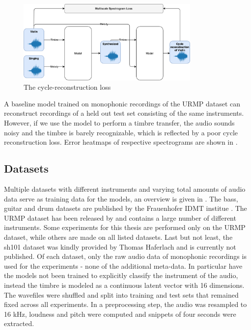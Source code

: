 \begin{figure}
\centering
\includegraphics[width=0.8\textwidth]{figures/cycle_reconstruction_loss.png}
\caption{The cycle-reconstruction loss}
\label{cycle-reconstruction}
\end{figure}

A baseline model trained on monophonic recordings of the URMP dataset can reconstruct recordings of a held out test set consisting of the same instruments.
However, if we use the model to perform a timbre transfer, the audio sounds noisy and the timbre is barely recognizable, which is reflected by a poor cycle reconstruction loss. Error heatmaps of respective spectrograms are shown in .


\subsection{Datasets}
\label{datasets}
Multiple datasets with different instruments and varying total amounts of audio data serve as training data for the models, an overview is given in .
The bass, guitar and drum datasets are published by the Frauenhofer IDMT institue \citep{idmt_bass} \cite{idmt_guitar} \citep{idmt_drum}.
The URMP dataset has been released by \citet{li_creating_2019} and contains a large number of different instruments. Some experiments for this thesis are performed only on the URMP dataset, while others are made on all listed datasets.
Last but not least, the sh101 dataset was kindly provided by Thomas Haferlach and is currently not published. \newline
Of each dataset, only the raw audio data of monophonic recordings is used for the experiments - none of the additional meta-data.
In particular have the models not been trained to explicitly classify the instrument of the audio, instead the timbre is modeled as a continuous latent vector with 16 dimensions.
The wavefiles were shuffled and split into training and test sets that remained fixed across all experiments.
In a preprocessing step, the audio was resampled to 16 kHz, loudness and pitch were computed and snippets of four seconds were extracted. \newline


